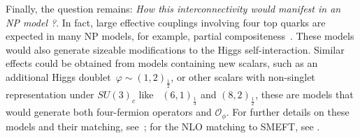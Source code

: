 	Finally, the question remains: \textit{How this interconnectivity would manifest in an NP model ?}. In fact, large effective couplings involving four top quarks are expected in many NP models, for example, partial compositeness~\cite{Banelli:2020iau}. These models would also generate sizeable modifications to the Higgs self-interaction. Similar effects could be obtained from models containing new scalars, such as an additional Higgs doublet~$\varphi\sim (1,2)_{\frac 12}$, or other scalars with non-singlet representation under $SU(3)_c$ like~ $(6,1)_{\frac 1 3}$ and $(8,2)_{\frac 1 2}$, these are models that would generate both four-fermion operators and $\mathcal{O}_\phi$. For further details on these models and their matching, see~\cite{deBlas:2017xtg}; for the NLO matching to SMEFT, see \cite{Anisha:2021hgc}. 